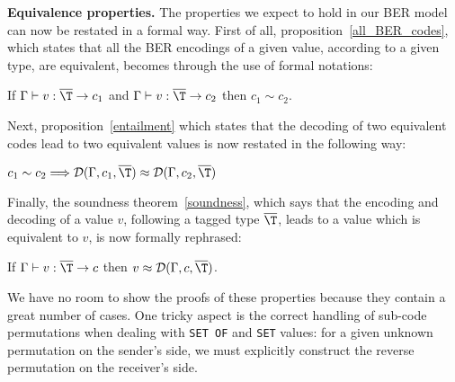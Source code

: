 \textbf{Equivalence properties.} The properties we expect to hold in
our BER model can now be restated in a formal way. First of all,
proposition~\ref{all_BER_codes}, which states that all the BER
encodings of a given value, according to a given type, are equivalent,
becomes through the use of formal notations:
\begin{proposition}
If $\coding{\Gamma}{v}{\overline{\T}}{c_1}$ and
$\coding{\Gamma}{v}{\overline{\T}}{c_2}$ then $c_1 \sim c_2$.
\end{proposition}
Next, proposition~\ref{entailment} which states that the decoding of
two equivalent codes lead to two equivalent values is now restated in
the following way:
\begin{proposition}
$c_1 \sim c_2 \Longrightarrow \decoding{\Gamma}{c_1}{\overline{\T}}
  \approx \decoding{\Gamma}{c_2}{\overline{\T}}$
\end{proposition}
Finally, the soundness theorem~\ref{soundness}, which says that the
encoding and decoding of a \core value $v$, following a \core tagged
type $\overline{\T}$, leads to a value which is equivalent to $v$, is
now formally rephrased:
\begin{theorem}[Soundness]
If $\coding{\Gamma}{v}{\overline{\T}}{c}$ then $v \approx
\decoding{\Gamma}{c}{\overline{\T}}$.
\end{theorem}
We have no room to show the proofs of these properties because they
contain a great number of cases. One tricky aspect is the correct
handling of sub-code permutations when dealing with \texttt{\small SET
OF} and \texttt{\small SET} values: for a given unknown permutation on
the sender's side, we must explicitly construct the reverse
permutation on the receiver's side.
